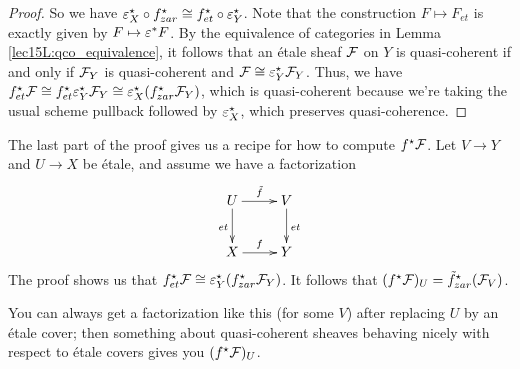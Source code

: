 \begin{proof}

   So we have $\varepsilon_X^\star \circ f_{zar}^\star \cong f_{et}^\star\circ \varepsilon_Y^\star$. Note
   that the construction $F\mapsto F_{et}$ is exactly given by $F\mapsto \varepsilon^*F$. By the
   equivalence of categories in Lemma \ref{lec15L:qco_equivalence}, it follows that an
   \'etale sheaf $\mathcal{F}$ on $Y$ is quasi-coherent if and only if $\mathcal{F}_Y$ is quasi-coherent
   and $\mathcal{F}\cong \varepsilon_Y^\star \mathcal{F}_Y$. Thus, we have $f^\star_{et} \mathcal{F} \cong f^\star_{et}
   \varepsilon^\star_Y \mathcal{F}_Y \cong \varepsilon^\star_X(f^\star_{zar} \mathcal{F}_Y)$, which is quasi-coherent because
   we're taking the usual scheme pullback followed by $\varepsilon_X^\star$, which preserves
   quasi-coherence.
 \end{proof}
 \begin{remark}
   The last part of the proof gives us a recipe for how to compute $f^\star\mathcal{F}$. Let $V\to
   Y$ and $U\to X$ be \'etale, and assume we have a factorization
   \[\xymatrix{
    U \ar[r]^{\tilde f} \ar[d]_{et} & V\ar[d]^{et}\\
    X\ar[r]^f & Y
   }\]
    The proof shows us that $f_{et}^\star \mathcal{F}\cong \varepsilon^\star_Y(f_{zar}^\star \mathcal{F}_Y)$.  It
   follows that $(f^\star \mathcal{F})_U = \tilde f^\star_{zar} (\mathcal{F}_V)$. 

   You can always get a factorization like this (for some $V$) after replacing $U$ by an
   \'etale cover; then something about quasi-coherent sheaves behaving nicely with
   respect to \'etale covers gives you $(f^\star\mathcal{F})_U$. \anton{}
 \end{remark}

